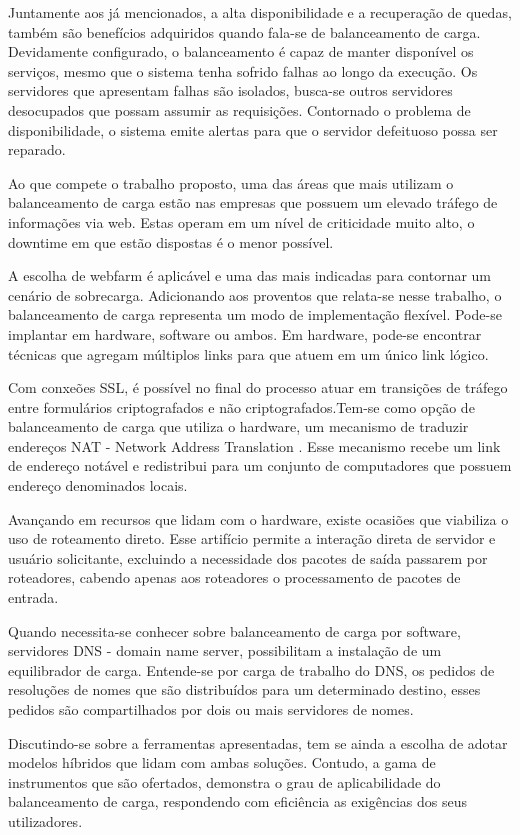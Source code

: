 Juntamente aos já mencionados, a alta disponibilidade e a recuperação de quedas, também são benefícios adquiridos quando
fala-se de balanceamento de carga. Devidamente configurado, o balanceamento é capaz de manter disponível os serviços, 
mesmo que o sistema tenha sofrido falhas ao longo da execução. Os servidores que apresentam falhas são isolados, 
busca-se outros servidores desocupados que possam assumir as requisições. Contornado o problema de disponibilidade, 
o sistema emite alertas para que o servidor defeituoso possa ser reparado.


Ao que compete o trabalho proposto, uma das áreas que mais utilizam o balanceamento de carga estão nas empresas que 
possuem um elevado tráfego de informações via web. Estas operam em um nível de criticidade muito alto, o downtime em 
que estão dispostas é o menor possível.


A escolha de webfarm é aplicável e uma das mais indicadas para contornar um cenário de sobrecarga. Adicionando aos 
proventos que relata-se  nesse trabalho, o balanceamento de carga representa um modo de implementação flexível. 
Pode-se implantar em hardware, software ou ambos. Em hardware, pode-se encontrar técnicas que agregam múltiplos 
links para que atuem em um único link lógico.


Com conxeões SSL, é possível no final do processo atuar em transições de tráfego entre formulários criptografados e 
não criptografados.Tem-se como opção de balanceamento de carga que utiliza
o hardware, um mecanismo de traduzir endereços NAT - Network Address Translation . Esse mecanismo recebe um link de 
endereço notável e redistribui para um conjunto de computadores que possuem endereço denominados locais.


Avançando em recursos que lidam com o hardware, existe ocasiões que viabiliza o uso de roteamento direto. Esse artifício
permite a interação direta de servidor e usuário solicitante, excluindo a necessidade dos pacotes de saída passarem por
roteadores, cabendo apenas aos roteadores o processamento de pacotes de entrada.


Quando necessita-se conhecer sobre balanceamento de carga por software, servidores DNS - domain name server, possibilitam
a instalação de um equilibrador de carga. Entende-se por carga de trabalho do DNS, os pedidos de resoluções de nomes que 
são distribuídos para um determinado destino, esses pedidos são compartilhados por dois ou mais servidores de nomes.


Discutindo-se sobre a ferramentas apresentadas, tem se ainda a escolha de adotar modelos híbridos que lidam com ambas
soluções. Contudo, a gama de instrumentos que são ofertados,  demonstra o grau de aplicabilidade do balanceamento de 
carga, respondendo com eficiência as exigências dos seus utilizadores. 

